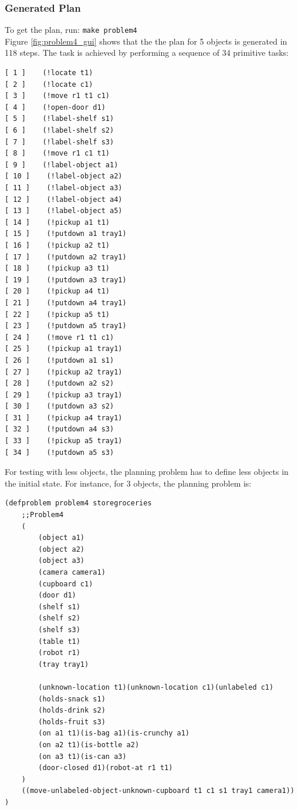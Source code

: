 \documentclass[paper=a4, fontsize=11pt]{scrartcl}
\begin{document}
	\subsubsection*{Generated Plan}
	
	To get the plan, run: \verb|make problem4| \\
	
	Figure \ref{fig:problem4_gui} shows that the the plan for 5 objects is generated in 118 steps. The task is achieved by performing a sequence of 34 primitive tasks: \\
	
	\begin{lstlisting}
[ 1 ]    (!locate t1)
[ 2 ]    (!locate c1)
[ 3 ]    (!move r1 t1 c1)
[ 4 ]    (!open-door d1)
[ 5 ]    (!label-shelf s1)
[ 6 ]    (!label-shelf s2)
[ 7 ]    (!label-shelf s3)
[ 8 ]    (!move r1 c1 t1)
[ 9 ]    (!label-object a1)
[ 10 ]    (!label-object a2)
[ 11 ]    (!label-object a3)
[ 12 ]    (!label-object a4)
[ 13 ]    (!label-object a5)
[ 14 ]    (!pickup a1 t1)
[ 15 ]    (!putdown a1 tray1)
[ 16 ]    (!pickup a2 t1)
[ 17 ]    (!putdown a2 tray1)
[ 18 ]    (!pickup a3 t1)
[ 19 ]    (!putdown a3 tray1)
[ 20 ]    (!pickup a4 t1)
[ 21 ]    (!putdown a4 tray1)
[ 22 ]    (!pickup a5 t1)
[ 23 ]    (!putdown a5 tray1)
[ 24 ]    (!move r1 t1 c1)
[ 25 ]    (!pickup a1 tray1)
[ 26 ]    (!putdown a1 s1)
[ 27 ]    (!pickup a2 tray1)
[ 28 ]    (!putdown a2 s2)
[ 29 ]    (!pickup a3 tray1)
[ 30 ]    (!putdown a3 s2)
[ 31 ]    (!pickup a4 tray1)
[ 32 ]    (!putdown a4 s3)
[ 33 ]    (!pickup a5 tray1)
[ 34 ]    (!putdown a5 s3)

	\end{lstlisting}
	
	\vspace{5mm}
	
	For testing with less objects, the planning problem has to define less objects in the initial state. For instance, for 3 objects, the planning problem is: \\
	
	\begin{lstlisting}
(defproblem problem4 storegroceries
	;;Problem4
	(
		(object a1)
		(object a2)
		(object a3)
		(camera camera1)
		(cupboard c1)
		(door d1)
		(shelf s1)
		(shelf s2)
		(shelf s3)
		(table t1)
		(robot r1)
		(tray tray1)
		
		(unknown-location t1)(unknown-location c1)(unlabeled c1)
		(holds-snack s1)
		(holds-drink s2)
		(holds-fruit s3)
		(on a1 t1)(is-bag a1)(is-crunchy a1)
		(on a2 t1)(is-bottle a2)
		(on a3 t1)(is-can a3)
		(door-closed d1)(robot-at r1 t1)
	)
	((move-unlabeled-object-unknown-cupboard t1 c1 s1 tray1 camera1))
)
	\end{lstlisting}
	
\end{document}
